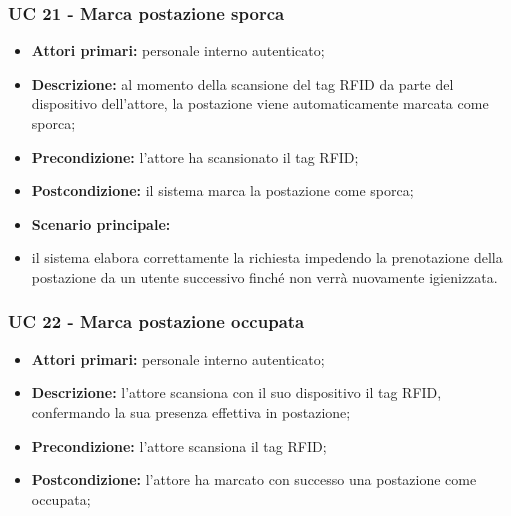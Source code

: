 \subsubsection{UC 21 - Marca postazione sporca}

\begin{itemize}
\item \textbf{Attori primari:} personale interno autenticato;
\item \textbf{Descrizione:} al momento della scansione del tag RFID da parte del dispositivo dell'attore, la postazione viene automaticamente marcata come sporca;
\item \textbf{Precondizione:} l'attore ha scansionato il tag RFID; 
\item \textbf{Postcondizione:} il sistema marca la postazione come sporca;
\item \textbf{Scenario principale:} 
		\item il sistema elabora correttamente la richiesta impedendo la prenotazione della postazione da un utente successivo finché non verrà nuovamente igienizzata.
\end{itemize}


\newpage

\subsubsection{UC 22 - Marca postazione occupata}

\begin{itemize}
\item \textbf{Attori primari:} personale interno autenticato;
\item \textbf{Descrizione:} l'attore scansiona con il suo dispositivo il tag RFID, confermando la sua presenza effettiva in postazione;
\item \textbf{Precondizione:} l'attore scansiona il tag RFID;
\item \textbf{Postcondizione:} l'attore ha marcato con successo una postazione come occupata;
\end{itemize}


